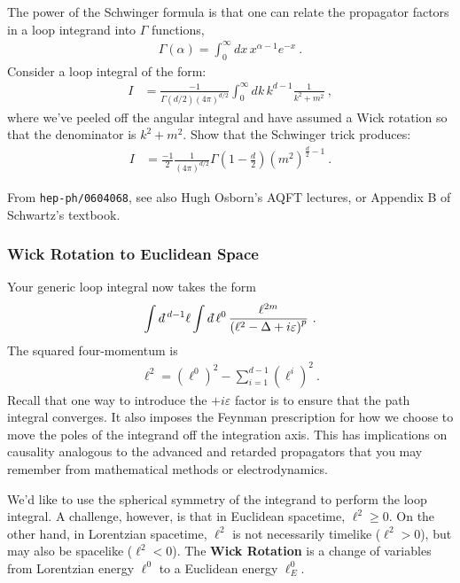 \documentclass[12pt]{article}
\numberwithin{equation}{subsection}    %
\newcommand{\dbar}{d\mkern-6mu\mathchar'26}    %
\begin{document}
The power of the Schwinger formula is that one can relate the propagator factors in a loop integrand into $\Gamma$ functions,
\begin{align}
	\Gamma(\alpha) = \int_0^\infty dx\, x^{\alpha-1}e^{-x} \ .
\end{align}
Consider a loop integral of the form:
\begin{align}
	I &=
	\frac{-1}{\Gamma(d/2) (4\pi)^{d/2}}
	\int_0^\infty
	dk \, k^{d-1}
	\frac{1}{k^2 + m^2} \ ,
\end{align}
where we've peeled off the angular integral and have assumed a Wick rotation so that the denominator is $k^2 + m^2$. Show that the Schwinger trick produces:
\begin{align}
	I &= 
	\frac{-1}{2}\frac{1}{(4\pi)^{d/2}} \Gamma\left(1-\frac{d}{2}\right)
	(m^2)^{\frac{d}{2}-1} \ .
\end{align}




{\footnotesize From \texttt{hep-ph/0604068}, see also Hugh Osborn's AQFT lectures, or Appendix B of Schwartz's textbook.}


\subsubsection{Wick Rotation to Euclidean Space}


Your generic loop integral now takes the form
\begin{align}
	\int \dbar^{d-1}\ell \int \dbar \ell^0 \, 
	\frac{\ell^{2m}}{\left(\ell^2 - \Delta + i\varepsilon\right)^p} \ .
	\label{eq:int:ell}
\end{align}
The squared four-momentum is
\begin{align}
	\ell^2 = (\ell^0)^2 - \sum_{i=1}^{d-1}(\ell^i)^2 \ .
\end{align}
Recall that one way to introduce the $+i\varepsilon$ factor is to ensure that the path integral converges. It also imposes the Feynman prescription for how we choose to move the poles of the integrand off the integration axis. This has implications on causality analogous to the advanced and retarded propagators that you may remember from mathematical methods or electrodynamics. 

We'd like to use the spherical symmetry of the integrand to perform the loop integral. A challenge, however, is that in Euclidean spacetime, $\ell^2\geq 0$. On the other hand, in Lorentzian spacetime, $\ell^2$ is not necessarily timelike ($\ell^2>0$), but may also be spacelike ($\ell^2 <0$). The \textbf{Wick Rotation} is a change of variables from Lorentzian energy $\ell^0$ to a Euclidean energy $\ell^0_E$. 
\end{document}
